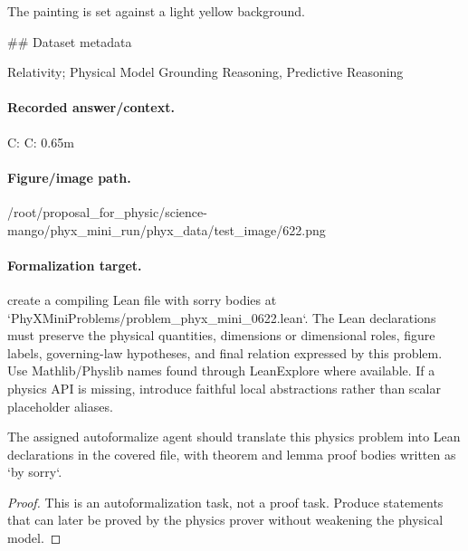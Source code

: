 The painting is set against a light yellow background.

\#\# Dataset metadata

Relativity; Physical Model Grounding Reasoning, Predictive Reasoning

\paragraph{Recorded answer/context.}
C: C: 0.65m

\paragraph{Figure/image path.}
/root/proposal\_for\_physic/science-mango/phyx\_mini\_run/phyx\_data/test\_image/622.png

\paragraph{Formalization target.}
create a compiling Lean file with sorry bodies at `PhyXMiniProblems/problem\_phyx\_mini\_0622.lean`. The Lean declarations must preserve the physical quantities, dimensions or dimensional roles, figure labels, governing-law hypotheses, and final relation expressed by this problem.
Use Mathlib/Physlib names found through LeanExplore where available. If a physics API is missing, introduce faithful local abstractions rather than scalar placeholder aliases.

\begin{theorem}
\label{thm:physics:phyx_mini_0622:target}
The assigned autoformalize agent should translate this physics problem into Lean declarations in the covered file, with theorem and lemma proof bodies written as `by sorry`.
\end{theorem}
\begin{proof}
This is an autoformalization task, not a proof task. Produce statements that can later be proved by the physics prover without weakening the physical model.
\end{proof}

